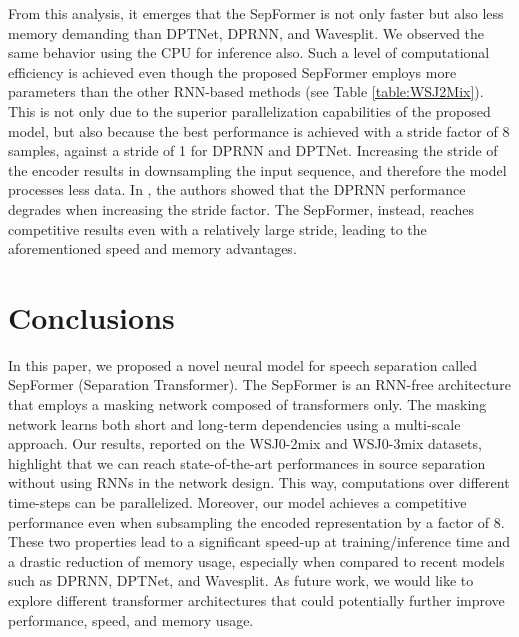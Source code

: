 \documentclass{article}
\begin{document}
From this analysis, it emerges that the SepFormer is not only faster but also less memory demanding than DPTNet, DPRNN, and Wavesplit. We observed the same behavior using the CPU for inference also. Such a level of computational efficiency is achieved even though the proposed SepFormer employs more parameters than the other RNN-based methods (see Table \ref{table:WSJ2Mix}).
This is not only due to the superior parallelization capabilities of the proposed model, but also because the best performance is achieved with a stride factor of 8 samples, against a stride of 1 for DPRNN and DPTNet. Increasing the stride of the encoder results in downsampling the input sequence, and therefore the model processes less data. In \cite{luo2020dualpath}, the authors showed that the DPRNN performance degrades when increasing the stride factor. The  SepFormer, instead, reaches competitive results even with a relatively large stride, leading to the aforementioned speed and memory advantages.


\vspace{-0.3cm}
\section{Conclusions}
\vspace{-0.2cm}
In this paper, we proposed a novel neural model for speech separation called SepFormer (Separation Transformer).
The SepFormer is an RNN-free architecture that employs a masking network composed of transformers only. The masking network learns both short and long-term dependencies using a multi-scale approach. Our results, reported on the WSJ0-2mix and  WSJ0-3mix datasets, highlight that we can reach state-of-the-art performances in source separation without using RNNs in the network design. This way, computations over different time-steps can be parallelized. Moreover, our model achieves a competitive performance even when subsampling the encoded representation by a factor of 8. These two properties lead to a significant speed-up at training/inference time and a drastic reduction of memory usage, especially when compared to recent models such as DPRNN, DPTNet, and Wavesplit. As future work, we would like to explore different transformer architectures that could potentially further improve performance, speed, and memory usage. 


\end{document}
